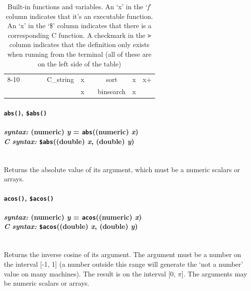 \documentclass{article}
\begin{document}
\begin{table}
\begin{center}
\begin{tabular}{|c|c|c|c||c|c|c||c|c|c|}
\cline{8-10}
 &  & & & C\_string & x & & sort & x & x+\\
 &  & & & & x & & binsearch & x & \\
\hline
\end{tabular}
\caption{Built-in functions and variables.  An `x' in the `\emph{f}' column indicates that it's an executable function.  An `x' in the `\$' column indicates that there is a corresponding C function.  A checkmark in the \texttt{>} column indicates that the definition only exists when running from the terminal (all of these are on the left side of the table)}
\label{built_in_IDs}
\end{center}
\end{table}





\paragraph{\texttt{abs()}, \texttt{\$abs()}\\\\
\normalfont \emph{syntax: } (numeric) \emph{y} = \texttt{abs}((numeric) \emph{x})\\
\normalfont \emph{C syntax: } \texttt{\$abs}((double) \emph{x}, (double) \emph{y})\\\\}

Returns the absolute value of its argument, which must be a numeric scalars or arrays.\\





\paragraph{\texttt{acos()}, \texttt{\$acos()}\\\\
\normalfont \emph{syntax: } (numeric) \emph{y} = \texttt{acos}((numeric) \emph{x})\\
\normalfont \emph{C syntax: } \texttt{\$acos}((double) \emph{x}, (double) \emph{y})\\\\}

Returns the inverse cosine of its argument.  The argument must be a number on the interval [-1, 1] (a number outside this range will generate the `not a number' value on many machines).  The result is on the interval [0, $\pi$].  The arguments may be numeric scalars or arrays.\\
\end{document}
